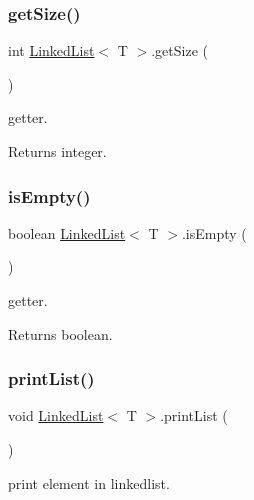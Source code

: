 \subsubsection{\texorpdfstring{get\+Size()}{getSize()}}
{\footnotesize\ttfamily int \mbox{\hyperlink{class_linked_list}{Linked\+List}}$<$ T $>$.get\+Size (\begin{DoxyParamCaption}{ }\end{DoxyParamCaption})\hspace{0.3cm}{\ttfamily [inline]}}

getter. \begin{DoxyReturn}{Returns}
integer. 
\end{DoxyReturn}
\mbox{\label{class_linked_list_aecae3d82587c52087a4f65d6c56900e2}} 
\subsubsection{\texorpdfstring{is\+Empty()}{isEmpty()}}
{\footnotesize\ttfamily boolean \mbox{\hyperlink{class_linked_list}{Linked\+List}}$<$ T $>$.is\+Empty (\begin{DoxyParamCaption}{ }\end{DoxyParamCaption})\hspace{0.3cm}{\ttfamily [inline]}}

getter. \begin{DoxyReturn}{Returns}
boolean. 
\end{DoxyReturn}
\mbox{\label{class_linked_list_aaa02d6cede50240f57de8115fbbc5b4d}} 
\subsubsection{\texorpdfstring{print\+List()}{printList()}}
{\footnotesize\ttfamily void \mbox{\hyperlink{class_linked_list}{Linked\+List}}$<$ T $>$.print\+List (\begin{DoxyParamCaption}{ }\end{DoxyParamCaption})\hspace{0.3cm}{\ttfamily [inline]}}

print element in linkedlist. \mbox{\label{class_linked_list_a85388ca2d7e4c8bc06fbea2c6fcfea33}} 
